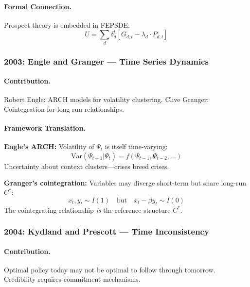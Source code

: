 \paragraph{Formal Connection.}
Prospect theory is embedded in FEPSDE:
\begin{equation}
  U = \sum_d \delta_d^t [G_{d,t} - \lambda_d \cdot P_{d,t}]
\end{equation}

\subsubsection{2003: Engle and Granger --- Time Series Dynamics}

\paragraph{Contribution.}
Robert Engle: ARCH models for volatility clustering.
Clive Granger: Cointegration for long-run relationships.

\paragraph{Framework Translation.}
\textbf{Engle's ARCH:} Volatility of $\Psi_t$ is itself time-varying:
\begin{equation}
  \text{Var}(\Psi_{t+1} | \Psi_t) = f(\Psi_{t-1}, \Psi_{t-2}, \ldots)
\end{equation}
Uncertainty about context clusters---crises breed crises.

\textbf{Granger's cointegration:} Variables may diverge short-term but share long-run $C^*$:
\begin{equation}
  x_t, y_t \sim I(1) \quad \text{but} \quad x_t - \beta y_t \sim I(0)
\end{equation}
The cointegrating relationship \emph{is} the reference structure $C^*$.

\subsubsection{2004: Kydland and Prescott --- Time Inconsistency}

\paragraph{Contribution.}
Optimal policy today may not be optimal to follow through tomorrow.
Credibility requires commitment mechanisms.

